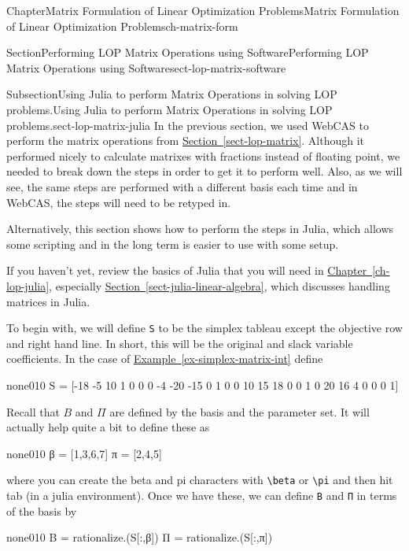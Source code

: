 \documentclass[oneside,10pt,]{book}
\newcommand{\xreffont}{\relax}
\newcommand{\mono}[1]{\texttt{#1}}
\numberwithin{equation}{section}
\begin{document}
\begin{chapterptx}{Chapter}{Matrix Formulation of Linear Optimization Problems}{}{Matrix Formulation of Linear Optimization Problems}{}{}{ch-matrix-form}
\begin{sectionptx}{Section}{Performing LOP Matrix Operations using Software}{}{Performing LOP Matrix Operations using Software}{}{}{sect-lop-matrix-software}
%
%
\typeout{************************************************}
\typeout{************************************************}
%
\begin{subsectionptx}{Subsection}{Using Julia to perform Matrix Operations in solving LOP problems.}{}{Using Julia to perform Matrix Operations in solving LOP problems.}{}{}{sect-lop-matrix-julia}
In the previous section, we used WebCAS to perform the matrix operations from \hyperref[sect-lop-matrix]{Section~{\xreffont\ref{sect-lop-matrix}}}. Although it performed nicely to calculate matrixes with fractions instead of floating point, we needed to break down the steps in order to get it to perform well. Also, as we will see, the same steps are performed with a different basis each time and in WebCAS, the steps will need to be retyped in.%
\par
Alternatively, this section shows how to perform the steps in Julia, which allows some scripting and in the long term is easier to use with some setup.%
\par
If you haven't yet, review the basics of Julia that you will need in \hyperref[ch-lop-julia]{Chapter~{\xreffont\ref{ch-lop-julia}}}, especially \hyperref[sect-julia-linear-algebra]{Section~{\xreffont\ref{sect-julia-linear-algebra}}}, which discusses handling matrices in Julia.%
\par
To begin with, we will define \mono{S} to be the simplex tableau except the objective row and right hand line. In short, this will be the original and slack variable coefficients. In the case of \hyperref[ex-simplex-matrix-int]{Example~{\xreffont\ref{ex-simplex-matrix-int}}} define%
\begin{program}{none}{0}{1}{0}
S = [-18 -5 10 1 0 0 0
  -4 -20 -15 0 1 0 0
  10 15 18 0 0 1 0
  20 16 4 0 0 0 1]
\end{program}
Recall that \(B\) and \(\Pi\) are defined by the basis and the parameter set. It will actually help quite a bit to define these as%
\begin{program}{none}{0}{1}{0}
β = [1,3,6,7]
π = [2,4,5]
\end{program}
where you can create the beta and pi characters with \mono{\textbackslash{}beta} or \mono{\textbackslash{}pi} and then hit tab (in a julia environment). Once we have these, we can define \mono{B} and \mono{Π} in terms of the basis by%
\begin{program}{none}{0}{1}{0}
B = rationalize.(S[:,β])
Π = rationalize.(S[:,π])

\end{program}
\end{subsectionptx}
\end{sectionptx}
\end{chapterptx}
\end{document}
